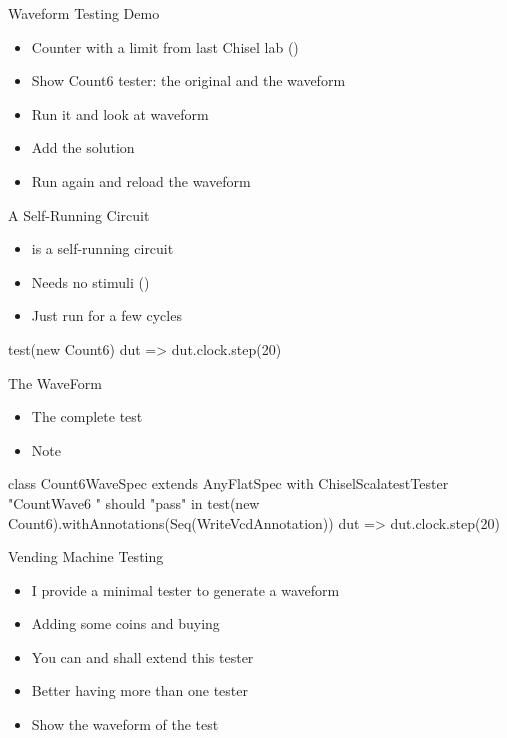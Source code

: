 \begin{frame}[fragile]{Waveform Testing Demo}
\begin{itemize}
\item Counter with a limit from last Chisel lab ()
\item Show Count6 tester: the original and the waveform
\item Run it and look at waveform
\item Add the solution
\item Run again and reload the waveform
\end{itemize}
\end{frame}

\begin{frame}[fragile]{A Self-Running Circuit}
\begin{itemize}
\item {} is a self-running circuit
\item Needs no stimuli ()
\item Just run for a few cycles
\end{itemize}
\begin{chisel}
    test(new Count6) { dut =>
      dut.clock.step(20)
    }
\end{chisel}
\end{frame}

\begin{frame}[fragile]{The WaveForm}
\begin{itemize}
\item The complete test
\item Note 
\end{itemize}
\begin{chisel}
class Count6WaveSpec extends AnyFlatSpec with ChiselScalatestTester {
  "CountWave6 " should "pass" in {
    test(new Count6).withAnnotations(Seq(WriteVcdAnnotation)) { dut =>
      dut.clock.step(20)
    }
  }
}
\end{chisel}
\end{frame}

\begin{frame}[fragile]{Vending Machine Testing}
\begin{itemize}
\item I provide a minimal tester to generate a waveform
\item Adding some coins and buying
\item You can and shall extend this tester
\item Better having more than one tester
\item Show the waveform of the test
\end{itemize}
\end{frame}


